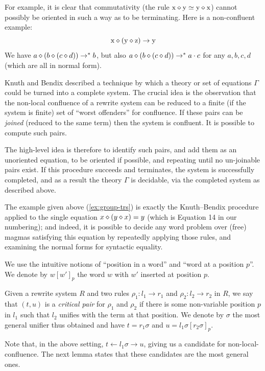 For example, it is clear that commutativity (the rule $\mathrm{x}\diamond \mathrm{y}\simeq \mathrm{y}\diamond \mathrm{x}$) cannot possibly be oriented in such a way as to be terminating. Here is a non-confluent example:
\[ \mathrm{x} \diamond (\mathrm{y} \diamond \mathrm{z}) \rightarrow \mathrm{y} \]
We have $a\diamond (b \diamond (c \diamond d)) \rightarrow^* b$, but also $a\diamond (b\diamond (c\diamond d))\rightarrow^* a\cdot c$ for any $a, b, c, d$ (which are all in normal form).

Knuth and Bendix \cite{knuth-bendix} described a technique by which a theory or set of equations $\Gamma$ could be turned into a complete system. The crucial idea is the observation that the non-local confluence of a rewrite system can be reduced to a finite (if the system is finite) set of ``worst offenders'' for confluence. If these pairs can be \emph{joined} (reduced to the same term) then the system is confluent. It is possible to compute such pairs.

The high-level idea is therefore to identify such pairs, and add them as an unoriented equation, to be oriented if possible, and repeating until no un-joinable pairs exist. If this procedure succeeds and terminates, the system is successfully completed, and as a result the theory $\Gamma$ is decidable, via the completed system as described above.

The example given above (\ref{ex:group-trs}) is exactly the Knuth--Bendix procedure applied to the single equation $x\diamond (y\diamond x) = y$ (which is Equation 14 in our numbering); and indeed, it is possible to decide any word problem over (free) magmas satisfying this equation by repeatedly applying those rules, and examining the normal forms for syntactic equality.

We use the intuitive notions of ``position in a word'' and ``word at a position $p$''. We denote by $w[w']_p$ the word $w$ with $w'$ inserted at position $p$.

\begin{definition}
  Given a rewrite system $R$ and two rules $\rho_1 \colon l_1\rightarrow r_1$ and $\rho_2 \colon l_2\rightarrow r_2$ in $R$, we say that $(t, u)$ is a \emph{critical pair} for $\rho_1$ and $\rho_2$ if there is some non-variable position $p$ in $l_1$ such that $l_2$ unifies with the term at that position. We denote by $\sigma$ the most general unifier thus obtained and have $t = r_1\sigma$ and $u = l_1\sigma[r_2\sigma]_p$.
\end{definition}

Note that, in the above setting, $t\leftarrow l_1\sigma\rightarrow u$, giving us a candidate for non-local-confluence. The next lemma states that these candidates are the most general ones.


